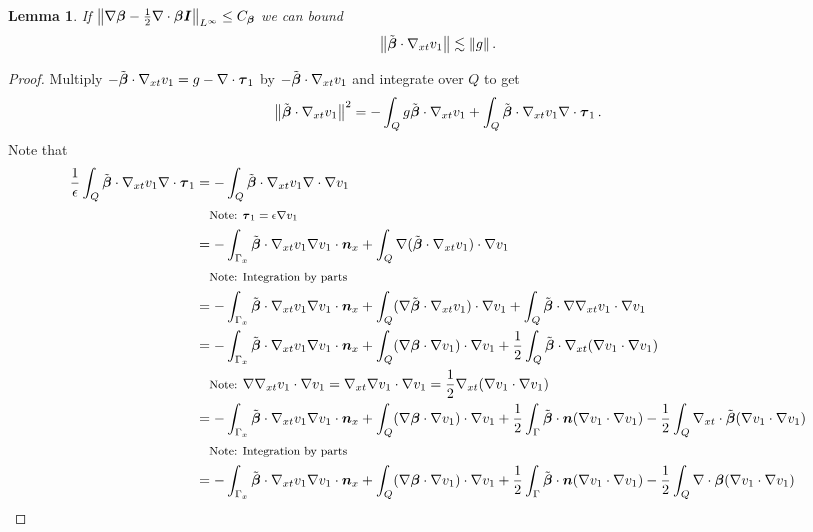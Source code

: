\documentclass{article}
\newtheorem{lemma}[theorem]{Lemma}
\theoremstyle{definition}
\theoremstyle{remark}
\begin{document}
\begin{lemma}
\label{lem:convective}
If 
$
\left\| \nabla\boldsymbol\beta-\frac{1}{2}\nabla\cdot\boldsymbol\beta\boldsymbol I \right\|_{L^{\infty}}\le C_{\boldsymbol\beta}
$
we can bound
\[
\left\| \tilde{\boldsymbol\beta}\cdot\nabla_{xt} v_1 \right\|\lesssim \left\| g \right\|.
\]
\end{lemma}
\begin{proof}
Multiply $-\tilde{\boldsymbol\beta}\cdot\nabla_{xt} v_1=g-\nabla\cdot\boldsymbol\tau_1$ by $-\tilde{\boldsymbol\beta}\cdot\nabla_{xt} v_1$ and integrate over $Q$ to get
\begin{equation}
\label{eq:adj1}
\left\| \tilde{\boldsymbol\beta}\cdot\nabla_{xt} v_1 \right\|^2=-\int_Q g\tilde{\boldsymbol\beta}\cdot\nabla_{xt} v_1+\int_Q\tilde{\boldsymbol\beta}\cdot\nabla_{xt} v_1\nabla\cdot\boldsymbol\tau_1\,.
\end{equation}
Note that
\begin{align*}
\frac{1}{\epsilon}\int_Q\tilde\bfbeta\cdot\Gradxt v_1\Div\bftau_1&=-\int_Q\tilde\bfbeta\cdot\Gradxt v_1\Div\Grad v_1 \\
&\quad\footnotesize{\text{Note: }\bftau_1=\epsilon\Grad v_1}
\\
%
&=-\int_{\Gamma_x}\tilde\bfbeta\cdot\Gradxt v_1\Grad v_1\cdot\bfn_x
+\int_Q\Grad(\tilde\bfbeta\cdot\Gradxt v_1)\cdot\Grad v_1 \\
&\quad\footnotesize{\text{Note: Integration by parts}}
\\
%
&=-\int_{\Gamma_x}\tilde\bfbeta\cdot\Gradxt v_1\Grad v_1\cdot\bfn_x
+\int_Q(\Grad\tilde\bfbeta\cdot\Gradxt v_1)\cdot\Grad v_1
+\int_Q\tilde\bfbeta\cdot\Grad\Gradxt v_1\cdot\Grad v_1\\
%
&=-\int_{\Gamma_x}\tilde\bfbeta\cdot\Gradxt v_1\Grad v_1\cdot\bfn_x
+\int_Q(\Grad\bfbeta\cdot\Grad v_1)\cdot\Grad v_1
+\frac{1}{2}\int_Q\tilde\bfbeta\cdot\Gradxt(\Grad v_1\cdot\Grad v_1)\\
&\quad\footnotesize{\text{Note: }\Grad\Gradxt v_1\cdot\Grad v_1=\Gradxt\Grad v_1\cdot\Grad v_1=\frac{1}{2}\Gradxt(\Grad v_1\cdot\Grad v_1)}
\\
%
&=-\int_{\Gamma_x}\tilde\bfbeta\cdot\Gradxt v_1\Grad v_1\cdot\bfn_x
+\int_Q(\Grad\bfbeta\cdot\Grad v_1)\cdot\Grad v_1
+\frac{1}{2}\int_\Gamma\tilde\bfbeta\cdot\bfn(\Grad v_1\cdot\Grad v_1)
-\frac{1}{2}\int_Q\Divxt\tilde\bfbeta(\Grad v_1\cdot\Grad v_1)\\
&\quad\footnotesize{\text{Note: Integration by parts}}
\\
%
&=-\int_{\Gamma_x}\tilde\bfbeta\cdot\Gradxt v_1\Grad v_1\cdot\bfn_x
+\int_Q(\Grad\bfbeta\cdot\Grad v_1)\cdot\Grad v_1
+\frac{1}{2}\int_\Gamma\tilde\bfbeta\cdot\bfn(\Grad v_1\cdot\Grad v_1)
-\frac{1}{2}\int_Q\Div\bfbeta(\Grad v_1\cdot\Grad v_1)\\

\end{align*}
\end{proof}
\end{document}
